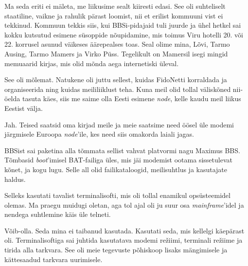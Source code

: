 Ma seda eriti ei mäleta, me liikusime sealt kiiresti 
edasi. See oli suhteliselt staatiline, vaikne ja rahulik pärast 
loomist, nii et erilist kommuuni vist ei tekkinud. Kommuun tekkis siis, kui BBSi-pidajaid tuli juurde ja ühel
hetkel sai kokku kutsutud esimene süsoppide nõupidamine, mis toimus Viru 
hotelli 20. või 22. korrusel asunud väikeses äärepealses toas. Seal olime mina, 
Lõvi, Tarmo Ausing, Tarmo 
Mamers ja Virko Püss. 
Tegelikult on Mamersil isegi mingid memuaarid kirjas, mis olid mõnda aega 
internetiski üleval. 


See oli mõlemat. Natukene oli juttu sellest, kuidas FidoNetti 
korraldada ja organiseerida ning kuidas meililiiklust teha. Kuna meil olid 
tollal väliskõned nii-öelda tasuta käes, siis me saime olla Eesti 
esimene \emph{node}, kelle kaudu meil liikus Eestist välja. 


Jah. Teised saatsid oma kirjad meile ja meie saatsime need öösel üle 
modemi järgmisele Euroopa \emph{node}'ile, kes need siis omakorda laiali jagas.


BBSist sai paketina
alla tõmmata sellist vahvat platvormi nagu Maximus BBS. 
Tõmbasid \emph{boot}'imisel BAT-failiga üles, mis jäi modemist ootama sissetulevat kõnet, ja kogu lugu. Selle all olid failikataloogid, 
meilisuhtlus ja kasutajate haldus.


Selleks kasutati tavalist terminalisofti, mis oli tollal enamikul 
opsüsteemidel olemas. Ma praegu muidugi oletan, aga tol ajal oli ju suur 
osa \emph{mainframe}'idel ja nendega suhtlemine käis üle telneti.


Võib-olla. Seda mina ei taibanud kasutada. Kasutati seda, mis kellelgi käepärast oli. Terminalisoftiga
sai juhtida kasutatava modemi režiimi, terminali režiime ja tirida 
alla tarkvara. See oli meie tegevuste põhiskoop lisaks mängimisele 
ja kättesaadud tarkvara uurimisele.


